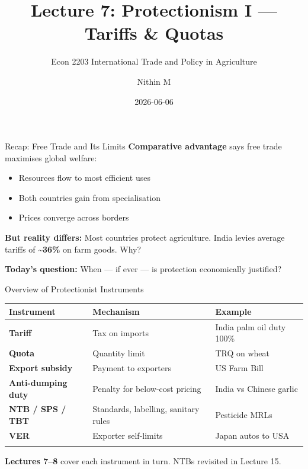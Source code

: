 \documentclass[
  ignorenonframetext,
  aspectratio=169,
]{beamer}
\title[L7 \textbar{} Protectionism I]{Lecture 7: Protectionism I ---
Tariffs \& Quotas}
\subtitle{Econ 2203 \textbar{} International Trade and Policy in
Agriculture}
\author{Nithin M}
\date{2026-06-06}
\institute{Department of Development Economics}
\makeatletter
\providecommand{\tightlist}{%
  \setlength{\itemsep}{0pt}\setlength{\parskip}{0pt}}
\let\quarto@originallabel\label
\DeclareRobustCommand*{\label}[1]{\quarto@originallabel{#1}}
\makeatother
\begin{document}
\frame{\titlepage}


\begin{frame}{Recap: Free Trade and Its Limits}
\label{recap-free-trade-and-its-limits}
\textbf{Comparative advantage} says free trade maximises global welfare:

\begin{itemize}
\tightlist
\item
  Resources flow to most efficient uses
\item
  Both countries gain from specialisation
\item
  Prices converge across borders
\end{itemize}

\textbf{But reality differs:} Most countries protect agriculture. India
levies average tariffs of \textbf{\textasciitilde36\%} on farm goods.
Why?

\textbf{Today's question:} When --- if ever --- is protection
economically justified?
\end{frame}

\begin{frame}{Overview of Protectionist Instruments}
\label{overview-of-protectionist-instruments}
\begin{longtable}[]{@{}
  >{\raggedright\arraybackslash}p{}
  >{\raggedright\arraybackslash}p{}
  >{\raggedright\arraybackslash}p{}@{}}
\toprule\noalign{}
\begin{minipage}[b]{\linewidth}\raggedright
Instrument
\end{minipage} & \begin{minipage}[b]{\linewidth}\raggedright
Mechanism
\end{minipage} & \begin{minipage}[b]{\linewidth}\raggedright
Example
\end{minipage} \\
\midrule\noalign{}
\endhead
\textbf{Tariff} & Tax on imports & India palm oil duty 100\% \\
\textbf{Quota} & Quantity limit & TRQ on wheat \\
\textbf{Export subsidy} & Payment to exporters & US Farm Bill \\
\textbf{Anti-dumping duty} & Penalty for below-cost pricing & India vs
Chinese garlic \\
\textbf{NTB / SPS / TBT} & Standards, labelling, sanitary rules &
Pesticide MRLs \\
\textbf{VER} & Exporter self-limits & Japan autos to USA \\
\bottomrule\noalign{}
\end{longtable}

\textbf{Lectures 7--8} cover each instrument in turn. NTBs revisited in
Lecture 15.
\end{frame}
\end{document}
